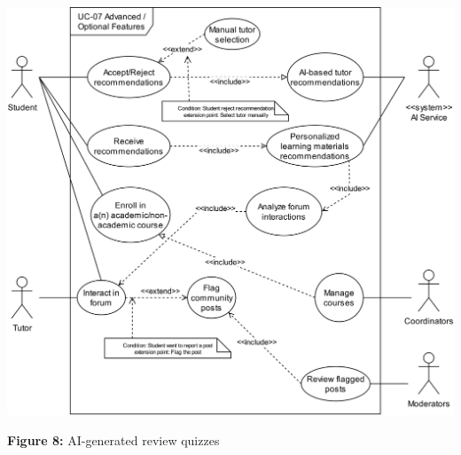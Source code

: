 
\begin{center}
\includegraphics[width=0.9\linewidth]{images/UC-07.png}
\end{center}

\begin{center}
\textbf{Figure 8:}  AI-generated review quizzes
\end{center}

